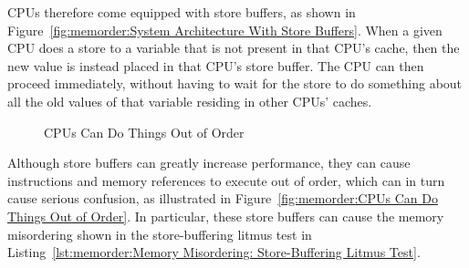 CPUs therefore come equipped with store buffers, as shown in
Figure~\ref{fig:memorder:System Architecture With Store Buffers}.
When a given CPU does a store to a variable that
is not present in that CPU's cache, then the new value
is instead placed in that CPU's store buffer.
The CPU can then proceed immediately, without having to wait for the
store to do something about all the old values of that variable
residing in other CPUs' caches.

\begin{figure}[htb]
\centering
{}
\caption{CPUs Can Do Things Out of Order}
\end{figure}

Although store buffers can greatly increase performance,
they can cause instructions and memory references to execute out
of order, which can in turn cause serious confusion, as illustrated in
Figure~\ref{fig:memorder:CPUs Can Do Things Out of Order}.
In particular, these store buffers can cause the memory misordering
shown in the store-buffering litmus test in
Listing~\ref{lst:memorder:Memory Misordering: Store-Buffering Litmus Test}.

